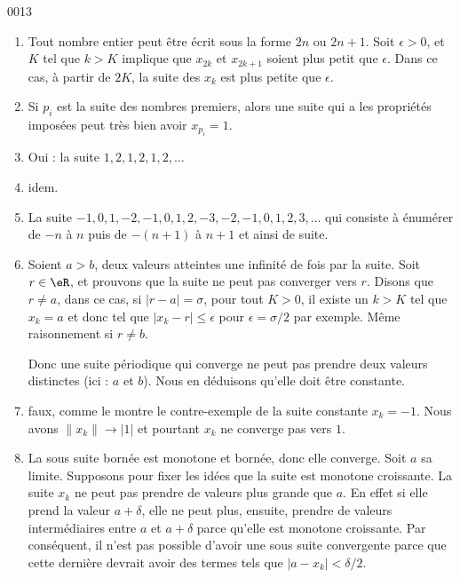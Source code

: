
\begin{corrige}{0013}

\begin{enumerate}
\item Tout nombre entier peut être écrit sous la forme $2n$ ou $2n+1$. Soit $\epsilon>0$, et $K$ tel que $k>K$ implique que $x_{2k}$ et $x_{2k+1}$ soient plus petit que $\epsilon$. Dans ce cas, à partir de $2K$, la suite des $x_k$ est plus petite que $\epsilon$.
\item Si $p_i$ est la suite des nombres premiers, alors une suite qui a les propriétés imposées peut très bien avoir $x_{p_i}=1$.
\item Oui : la suite $1,2,1,2,1,2,\ldots$
\item idem.
\item La suite $-1,0,1,-2,-1,0,1,2,-3,-2,-1,0,1,2,3,\ldots$ qui consiste à énumérer de $-n$ à $n$ puis de $-(n+1)$ à $n+1$ et ainsi de suite.
\item Soient $a>b$, deux valeurs atteintes une infinité de fois par la suite. Soit $r\in\eR$, et prouvons que la suite ne peut pas converger vers $r$. Disons que $r\neq a$, dans ce cas, si $| r-a |=\sigma$, pour tout $K>0$, il existe un $k>K$ tel que $x_k=a$ et donc tel que $| x_k-r |\leq\epsilon$ pour $\epsilon=\sigma/2$ par exemple. Même raisonnement si $r\neq b$.

Donc une suite périodique qui converge ne peut pas prendre deux valeurs distinctes (ici : $a$ et $b$). Nous en déduisons qu'elle doit être constante.

\item faux, comme le montre le contre-exemple de la suite constante $x_k=-1$. Nous avons $\| x_k \|\to| 1 |$ et pourtant $x_k$ ne converge pas vers $1$.

\item La sous suite bornée est monotone et bornée, donc elle converge. Soit $a$ sa limite. Supposons pour fixer les idées que la suite est monotone croissante. La suite $x_k$ ne peut pas prendre de valeurs plus grande que $a$. En effet si elle prend la valeur $a+\delta$, elle ne peut plus, ensuite, prendre de valeurs intermédiaires entre $a$ et $a+\delta$ parce qu'elle est monotone croissante. Par conséquent, il n'est pas possible d'avoir une sous suite convergente parce que cette dernière devrait avoir des termes tels que $| a-x_k |<\delta/2$.


\end{enumerate}
\end{corrige}
